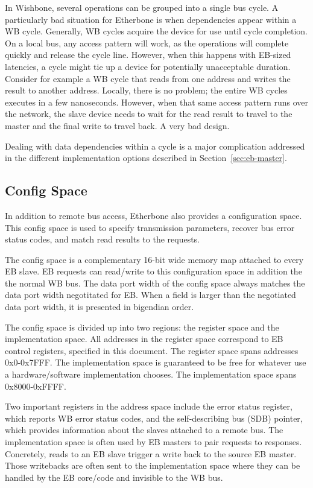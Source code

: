 \documentclass{article}
\begin{document}
In Wishbone, several operations can be grouped into a single bus cycle.
A particularly bad situation for Etherbone is when dependencies appear within a WB cycle.
Generally, WB cycles acquire the device for use until cycle completion.
On a local bus, any access pattern will work, 
as the operations will complete quickly and release the cycle line.
However, when this happens with EB-sized latencies, 
a cycle might tie up a device for potentially unacceptable duration.
Consider for example a WB cycle that reads from one address 
and writes the result to another address.
Locally, there is no problem; the entire WB cycles executes in a few
nanoseconds.
However, when that same access pattern runs over the network,
the slave device needs to wait for the read result to travel to the master and the final write to travel back.
A very bad design.

Dealing with data dependencies within a cycle is a major complication
addressed in the different implementation options described in
Section~\ref{sec:eb-master}.

\subsection{Config Space}

In addition to remote bus access, 
Etherbone also provides a configuration space.
This config space is used to specify transmission parameters,
recover bus error status codes,
and match read results to the requests.

The config space is a complementary 16-bit wide memory map attached to every EB slave.
EB requests can read/write to this configuration space in addition the the normal WB bus.
The data port width of the config space always matches the data port width negotitated for EB.
When a field is larger than the negotiated data port width, it is presented in bigendian order.

The config space is divided up into two regions: the register space and the implementation space.
All addresses in the register space correspond to EB control registers,
specified in this document.
The register space spans addresses 0x0-0x7FFF.
The implementation space is guaranteed to be free for whatever use
a hardware/software implementation chooses.
The implementation space spans 0x8000-0xFFFF.

Two important registers in the address space include the error status
register, which reports WB error status codes, and the self-describing bus (SDB) pointer,
which provides information about the slaves attached to a remote bus.
The implementation space is often used by EB masters to pair requests to responses.
Concretely, reads to an EB slave trigger a write back to the source EB master.
Those writebacks are often sent to the implementation space 
where they can be handled by the EB core/code and invisible to the WB bus.
\end{document}
